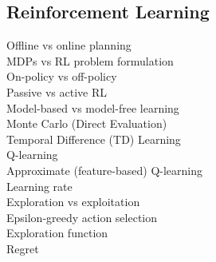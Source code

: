 \documentclass[a4paper]{article}
\begin{document}
\begin{multicols*}{2}
\section{Reinforcement Learning}
Offline vs online planning \\
MDPs vs RL problem formulation \\
On-policy vs off-policy \\
Passive vs active RL \\
Model-based vs model-free learning \\
Monte Carlo (Direct Evaluation) \\
Temporal Difference (TD) Learning \\
Q-learning \\
Approximate (feature-based) Q-learning \\
Learning rate \\
Exploration vs exploitation \\
Epsilon-greedy action selection \\
Exploration function \\
Regret \\


\end{multicols*}
\end{document}
